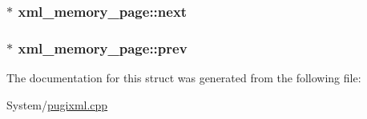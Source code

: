 \hypertarget{structxml__memory__page_a326a74e009af80219ea31bc65ed9e45e}{
\subsubsection[{next}]{$\ast$ xml\-\_\-memory\-\_\-page\-::next}}\label{structxml__memory__page_a326a74e009af80219ea31bc65ed9e45e}
\hypertarget{structxml__memory__page_a014969b0e4a34a6cb24e9823791e60ab}{
\subsubsection[{prev}]{$\ast$ xml\-\_\-memory\-\_\-page\-::prev}}\label{structxml__memory__page_a014969b0e4a34a6cb24e9823791e60ab}


The documentation for this struct was generated from the following file\-:\begin{DoxyCompactItemize}
\item 
System/\hyperlink{pugixml_8cpp}{pugixml.\-cpp}\end{DoxyCompactItemize}
